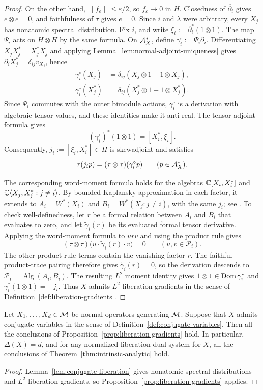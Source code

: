 \begin{proof}
On the other hand, $\|f_\varepsilon\|\leq\varepsilon/2$, so $f_\varepsilon\to0$ in $H$.
Closedness of $\overline{\partial_i}$ gives $e\otimes e=0$, and faithfulness of $\tau$ gives $e=0$.
Since $i$ and $\lambda$ were arbitrary, every $X_j$ has nonatomic spectral distribution.
Fix $i$, and write $\xi_i:=\partial_i^*(1\otimes1)$.
The map $\Psi_i$ acts on $H\bar\otimes H$ by the same formula.
On $\mathcal A_X^\ast$, define $\gamma_i^\circ:=\Psi_i\partial_i$.
Differentiating $X_jX_j^*=X_j^*X_j$ and applying Lemma~\ref{lem:normal-adjoint-uniqueness} gives $\partial_iX_j^*=\delta_{ij}v_{X_j}$, hence
\[
 \begin{aligned}
  \gamma_i^\circ(X_j)&=\delta_{ij}(X_j\otimes1-1\otimes X_j),\\
  \gamma_i^\circ(X_j^*)&=\delta_{ij}(X_j^*\otimes1-1\otimes X_j^*).
 \end{aligned}
\]
Since $\Psi_i$ commutes with the outer bimodule actions, $\gamma_i^\circ$ is a derivation with algebraic tensor values, and these identities make it anti-real.
The tensor-adjoint formula \cite[Lemma~4.3]{Mai15} gives
\[
 (\gamma_i^\circ)^*(1\otimes1)=[X_i^*,\xi_i].
\]
Consequently, $j_i:=[\xi_i,X_i^*]\in H$ is skewadjoint and satisfies
\[
 \tau(j_ip)=(\tau\otimes\tau)(\gamma_i^\circ p)
 \qquad(p\in\mathcal A_X^\ast).
\]

The corresponding word-moment formula holds for the algebras $\mathbb C[X_i,X_i^*]$ and $\mathbb C\langle X_j,X_j^*:j\ne i\rangle$.
By bounded Kaplansky approximation in each factor, it extends to $A_i=W^*(X_i)$ and $B_i=W^*(X_j:j\ne i)$, with the same $j_i$; see \cite[Remark~5.5(c)]{Voi99}.
To check well-definedness, let $r$ be a formal relation between $A_i$ and $B_i$ that evaluates to zero, and let $\widetilde\gamma_i(r)$ be its evaluated formal tensor derivative.
Applying the word-moment formula to $urv$ and using the product rule gives
\[
 (\tau\otimes\tau)\bigl(u\cdot\widetilde\gamma_i(r)\cdot v\bigr)=0
 \qquad(u,v\in\mathcal P_i).
\]
The other product-rule terms contain the vanishing factor $r$.
The faithful product-trace pairing therefore gives $\widetilde\gamma_i(r)=0$, so the derivation descends to $\mathcal P_i=\operatorname{Alg}(A_i,B_i)$.
The resulting $L^2$ moment identity gives
$1\otimes1\in\operatorname{Dom}\gamma_i^*$ and $\gamma_i^*(1\otimes1)=-j_i$.
Thus $X$ admits $L^2$ liberation gradients in the sense of Definition~\ref{def:liberation-gradients}.
\end{proof}

\begin{corollary}\label{prop:normal-conjugates}
Let $X_1,\ldots,X_d\in\mathcal M$ be normal operators generating $\mathcal M$.
Suppose that $X$ admits conjugate variables in the sense of Definition~\ref{def:conjugate-variables}.
Then all the conclusions of Proposition~\ref{prop:liberation-gradients} hold.
In particular, $\Delta(X)=d$, and for any normalized liberation dual system for $X$, all the conclusions of Theorem~\ref{thm:intrinsic-analytic} hold.
\end{corollary}
\begin{proof}
Lemma~\ref{lem:conjugate-liberation} gives nonatomic spectral distributions and $L^2$ liberation gradients, so Proposition~\ref{prop:liberation-gradients} applies.
\end{proof}


